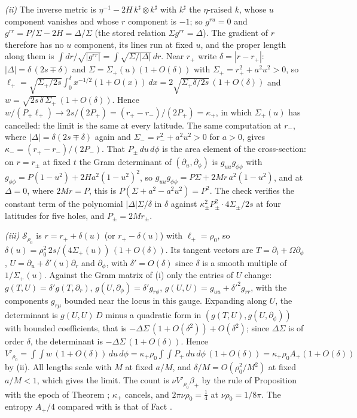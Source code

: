 \emph{(ii)} The inverse metric is $\eta^{-1} - 2H\,k^\sharp\otimes k^\sharp$ with $k^\sharp$ the $\eta$-raised $k$, whose $u$ component vanishes and whose $r$ component is $-1$; so $g^{ru} = 0$ and $g^{rr} = P/\Sigma - 2H = \Delta/\Sigma$ (the stored relation $\Sigma g^{rr} = \Delta$). The gradient of $r$ therefore has no $u$ component, its lines run at fixed $u$, and the proper length along them is $\int dr/\sqrt{|g^{rr}|} = \int\sqrt{\Sigma/|\Delta|}\,dr$. Near $r_+$ write $\delta = |r - r_+|$: $|\Delta| = \delta\,(2s \mp \delta)$ and $\Sigma = \Sigma_+(u)(1 + O(\delta))$ with $\Sigma_+ = r_+^2 + a^2u^2 > 0$, so $\ell_+ = \sqrt{\Sigma_+/2s}\int_0^{\delta}x^{-1/2}(1 + O(x))\,dx = 2\sqrt{\Sigma_+\delta/2s}\,(1 + O(\delta))$ and $w = \sqrt{2s\,\delta\,\Sigma_+}\,(1 + O(\delta))$. Hence $w/(P_+\ell_+) \to 2s/(2P_+) = (r_+ - r_-)/(2P_+) = \kappa_+$, in which $\Sigma_+(u)$ has cancelled: the limit is the same at every latitude. The same computation at $r_-$, where $|\Delta| = \delta(2s \mp \delta)$ again and $\Sigma_- = r_-^2 + a^2u^2 > 0$ for $a > 0$, gives $\kappa_- = (r_+ - r_-)/(2P_-)$. That $P_\pm\,du\,d\phi$ is the area element of the cross-section: on $r = r_\pm$ at fixed $t$ the Gram determinant of $(\partial_u, \partial_\phi)$ is $g_{uu}g_{\phi\phi}$ with $g_{\phi\phi} = P(1-u^2) + 2Ha^2(1-u^2)^2$, so $g_{uu}g_{\phi\phi} = P\Sigma + 2Mr\,a^2(1-u^2)$, and at $\Delta = 0$, where $2Mr = P$, this is $P(\Sigma + a^2 - a^2u^2) = P^2$. The check verifies the constant term of the polynomial $|\Delta|\Sigma/\delta$ in $\delta$ against $\kappa_\pm^2P_\pm^2\cdot 4\Sigma_\pm/2s$ at four latitudes for five holes, and $P_\pm = 2Mr_\pm$.

\emph{(iii)} $\mathcal{S}_{\rho_0}$ is $r = r_+ + \delta(u)$ (or $r_+ - \delta(u)$) with $\ell_+ = \rho_0$, so $\delta(u) = \rho_0^2\,2s/(4\Sigma_+(u))\,(1 + O(\delta))$. Its tangent vectors are $T = \partial_t + \Omega\partial_\phi$, $U = \partial_u + \delta'(u)\partial_r$ and $\partial_\phi$, with $\delta' = O(\delta)$ since $\delta$ is a smooth multiple of $1/\Sigma_+(u)$. Against the Gram matrix of (i) only the entries of $U$ change: $g(T,U) = \delta'g(T,\partial_r)$, $g(U,\partial_\phi) = \delta'g_{r\phi}$, $g(U,U) = g_{uu} + \delta'^2g_{rr}$, with the components $g_{r\mu}$ bounded near the locus in this gauge. Expanding along $U$, the determinant is $g(U,U)\,D$ minus a quadratic form in $(g(T,U), g(U,\partial_\phi))$ with bounded coefficients, that is $-\Delta\Sigma\,(1 + O(\delta^2)) + O(\delta^2)$; since $\Delta\Sigma$ is of order $\delta$, the determinant is $-\Delta\Sigma\,(1 + O(\delta))$. Hence $V'_{\rho_0} = \int\!\!\int w\,(1 + O(\delta))\,du\,d\phi = \kappa_+\rho_0\int\!\!\int P_+\,du\,d\phi\,(1 + O(\delta)) = \kappa_+\rho_0A_+(1 + O(\delta))$ by (ii). All lengths scale with $M$ at fixed $a/M$, and $\delta/M = O(\rho_0^2/M^2)$ at fixed $a/M < 1$, which gives the limit. The count is $\nu V'_{\rho_0}\beta_+$ by the rule of Proposition  with the epoch of Theorem ; $\kappa_+$ cancels, and $2\pi\nu\rho_0 = \tfrac14$ at $\nu\rho_0 = 1/8\pi$. The entropy $A_+/4$ compared with is that of Fact .

